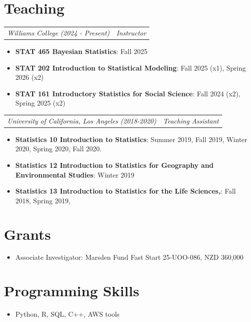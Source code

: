 \documentclass[letterpaper,11pt]{article}
\makeatletter
\newcommand{\resumeItem}[2]{
  \item\small{
    \textbf{#1}{: #2 \vspace{-2pt}}
  }
}
\newcommand{\resumeSubheading}[4]{
  \vspace{-1pt}\item
    \begin{tabular*}{0.97\textwidth}{l@{\extracolsep{\fill}}r}
      \textbf{#1} & #2 \\
      \textit{\small#3} & \textit{\small #4} \\
    \end{tabular*}\vspace{-5pt}
}
\newcommand{\resumeSubheadingCont}[2]{
  \vspace{-1pt}
    \begin{tabular*}{0.97\textwidth}{l@{\extracolsep{\fill}}r}
      \textit{\small#1} & \textit{\small #2} \\
    \end{tabular*}\vspace{-5pt}
}
\newcommand{\resumeSubItem}[2]{\resumeItem{#1}{#2}\vspace{-4pt}}
\newcommand{\resumeSubHeadingListStartNoBullet}{\begin{itemize}[leftmargin=*,label={}]}
\newcommand{\resumeSubHeadingListStart}{\begin{itemize}[leftmargin=*]}
\newcommand{\resumeSubHeadingListEnd}{\end{itemize}}
\makeatother
\begin{document}
\section{Teaching}
\resumeSubheadingCont 
          {Williams College (2024 - Present) }{Instructor}
  
  \resumeSubHeadingListStartNoBullet
      \resumeSubItem{STAT 465 Bayesian Statistics}{Fall 2025}
      \resumeSubItem{STAT 202 Introduction to Statistical Modeling}{Fall 2025 (x1), Spring 2026 (x2)}
    \resumeSubItem{STAT 161 Introductory Statistics for Social Science}{Fall 2024 (x2), Spring 2025 (x2)}
    \resumeSubHeadingListEnd
\resumeSubheadingCont
          {University of California, Los Angeles (2018-2020)}{Teaching Assistant}
  \resumeSubHeadingListStartNoBullet
    \resumeSubItem{Statistics 10 Introduction to Statistics}{Summer 2019, Fall 2019, Winter 2020, Spring 2020, Fall 2020.}
    \resumeSubItem{Statistics 12 Introduction to Statistics for Geography and Environmental Studies}{Winter 2019}
    \resumeSubItem{Statistics 13 Introduction to Statistics for the Life Sciences,}{Fall 2018, Spring 2019,}
\resumeSubHeadingListEnd

\renewcommand{\resumeSubheading}[4]{
  \vspace{-1pt}\item
    \begin{tabular*}{0.97\textwidth}{l@{\extracolsep{\fill}}r}
      \textbf{#1} & #2 \\
      \textit{\small#3} & \textit{\small #4} \\
    \end{tabular*}\vspace{-5pt}
}

\section{Grants}
 \resumeSubHeadingListStart
    \item Associate Investigator: Marsden Fund Fast Start 25-UOO-086, NZD 360,000
 \resumeSubHeadingListEnd


\section{Programming Skills}
 \resumeSubHeadingListStart
    \item Python, R, SQL, C++, AWS tools
 \resumeSubHeadingListEnd
\end{document}
